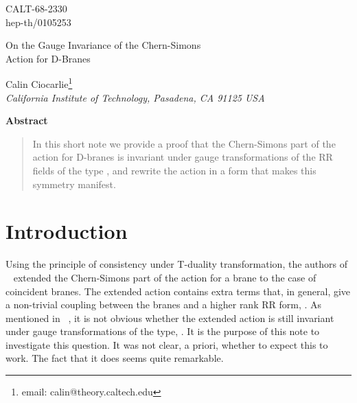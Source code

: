 \documentclass[a4paper,12pt]{article}
\begin{document}
\vspace*{-.6in}
\thispagestyle{empty}
\begin{flushright}
CALT-68-2330\\
hep-th/0105253
\end{flushright}

\vspace{.5in}

{\Large
\begin{center}

On the Gauge Invariance of the Chern-Simons \\
 Action for \coordHE{} D-Branes
\end{center}}
\begin{center}
Calin Ciocarlie\footnote{email: calin@theory.caltech.edu} \\
\emph{ California Institute of Technology, Pasadena, CA  91125 USA}
\end{center}
\vspace*{1in}

\begin{center}
\textbf{Abstract}
\end{center}
\begin{quotation}
\noindent In this short note we provide a proof that the Chern-Simons part of the action for \coordHE{} D-branes is invariant under gauge transformations of the RR fields of the type \coordHE{}, and rewrite the action in a form that makes this symmetry manifest.
\end{quotation}
\vfil
\newpage


\section{Introduction}

   Using the principle of consistency under T-duality transformation, the authors of ~\cite{myers, taylor1} extended the Chern-Simons part of the action for a \coordHE{} brane to the case of \coordHE{} coincident \coordHE{} branes.   The extended action contains extra terms that, in general, give a non-trivial coupling between the \coordHE{}  \coordHE{} branes and a higher rank RR form, \coordHE{}. As mentioned in ~\cite{schwarz}, it is not obvious whether the extended action is still invariant under gauge transformations of the type,  \coordHE{}. It is the purpose of this note to investigate this question. It was not clear, a priori, whether to expect this to work. The fact that it does seems quite remarkable. 
    
\end{document}
